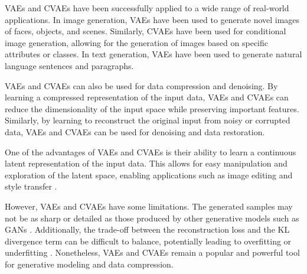 
VAEs and CVAEs have been successfully applied to a wide range of real-world applications. In image generation, VAEs have been used to generate novel images of faces, objects, and scenes. Similarly, CVAEs have been used for conditional image generation, allowing for the generation of images based on specific attributes or classes. In text generation, VAEs have been used to generate natural language sentences and paragraphs.

VAEs and CVAEs can also be used for data compression and denoising. By learning a compressed representation of the input data, VAEs and CVAEs can reduce the dimensionality of the input space while preserving important features. Similarly, by learning to reconstruct the original input from noisy or corrupted data, VAEs and CVAEs can be used for denoising and data restoration.

One of the advantages of VAEs and CVAEs is their ability to learn a continuous latent representation of the input data. This allows for easy manipulation and exploration of the latent space, enabling applications such as image editing and style transfer .

However, VAEs and CVAEs have some limitations. The generated samples may not be as sharp or detailed as those produced by other generative models such as GANs . Additionally, the trade-off between the reconstruction loss and the KL divergence term can be difficult to balance, potentially leading to overfitting or underfitting . Nonetheless, VAEs and CVAEs remain a popular and powerful tool for generative modeling and data compression.


% 

% 

